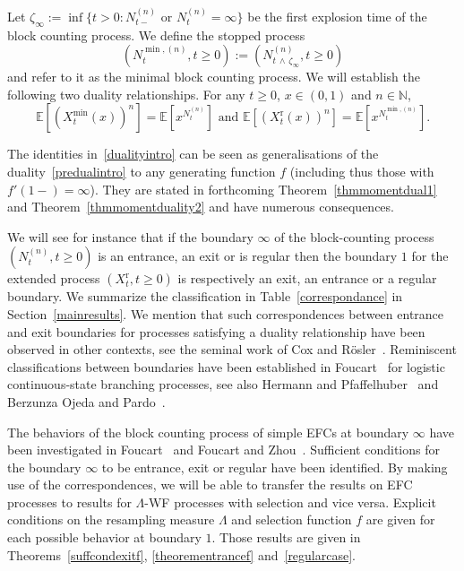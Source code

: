 \documentclass[AHL,Unicode,longabstracts,published]{cedram}
\newcommand{\rmr}{\mathrm{r}}
\newcommand{\bbN}{\mathbb{N}}
\newcommand{\bbE}{\mathbb{E}}
\begin{document}
Let $\zeta_\infty:=\inf\{t>0: N^{(n)}_{t-} \text{ or } N^{(n)}_{t}=\infty\}$ be the first explosion time of the block counting process. We define the stopped process 
\[
\left(N^{\min,(n)}_t,t\geq 0\right):= \left(N^{(n)}_{t\,\wedge\,\zeta_\infty},t\geq 0\right)
\]
and refer to it as the minimal block counting process. We will establish the following two duality relationships. For any $t\geq 0$, $x\in (0,1)$ and $n\in \bbN$,
\begin{equation}\label{dualityintro}
\bbE\left[\left(X^{\min}_t(x)\right)^n\right]=\bbE\left[x^{N^{(n)}_t}\right] \text{ and } \bbE\left[\left(X^{\rmr}_t(x)\right)^n\right]=\bbE\left[x^{N^{\min,(n)}_t}\right].
\end{equation}

The identities in~\eqref{dualityintro} can be seen as generalisations of the duality~\eqref{predualintro} to any generating function $f$ (including thus those with $f'(1-)=\infty$). They are stated in forthcoming Theorem~\ref{thmmomentdual1} and Theorem~\ref{thmmomentduality2} and have numerous consequences.

We will see for instance that if the boundary $\infty$ of the block-counting process $(N_t^{(n)},t\geq 0)$ is an entrance, an exit or is regular then the boundary $1$ for the extended process $(X_t^{\rmr},t\geq 0)$ is respectively an exit, an entrance or a regular boundary. We summarize the classification in Table~\ref{correspondance} in Section~\ref{mainresults}. We mention that such correspondences between entrance and exit boundaries for processes satisfying a duality relationship have been observed in other contexts, see the seminal work of Cox and R\"osler~\cite{zbMATH03828986}. Reminiscent classifications between boundaries have been established in Foucart~\cite{zbMATH07055671} for logistic continuous-state branching processes, see also Hermann and Pfaffelhuber~\cite{Hermann} and Berzunza Ojeda and Pardo~\cite{Berzunza}.

The behaviors of the block counting process of simple EFCs at boundary $\infty$ have been investigated in Foucart~\cite{cdiEFC} and Foucart and Zhou~\cite{explosion}. Sufficient conditions for the boundary $\infty$ to be entrance, exit or regular have been identified. By making use of the correspondences, we will be able to transfer the results on EFC processes to results for $\Lambda$-WF processes with selection and vice versa. Explicit conditions on the resampling measure $\Lambda$ and selection function $f$ are given for each possible behavior at boundary $1$. Those results are given in Theorems~\ref{suffcondexitf}, \ref{theorementrancef} and~\ref{regularcase}.
\end{document}
